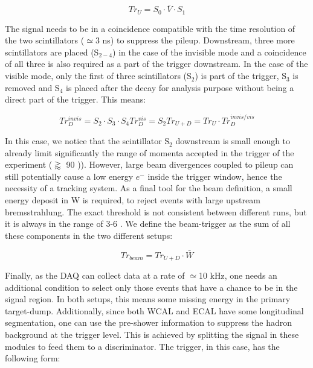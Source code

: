 \begin{equation}
\label{eq:trigger-upstream}
Tr_U = S_0 \cdot \bar{V} \cdot S_1
\end{equation}

The signal needs to be in a coincidence compatible with the time resolution of the two scintillators ($\simeq$3 \si{ns}) to suppress the pileup. Downstream, three more scintillators are placed (S$_{2-4}$) in the case of the invisible mode and a coincidence of all three is also required as a part of the trigger downstream. In the case of the visible mode, only the first of three scintillators (S$_2$) is part of the trigger, S$_3$ is removed and S$_4$ is placed after the decay for analysis purpose without being a direct part of the trigger. This means:

\begin{equation}
\label{eq:trigger-downstream}
Tr^{invis}_D = S_2 \cdot S_3 \cdot S_4
Tr^{vis}_D = S_2
Tr_{U+D} = Tr_U \cdot Tr^{invis/vis}_D
\end{equation}

In this case, we notice that the scintillator S$_2$ downstream is small enough to already limit significantly the range of momenta accepted in the trigger of the experiment ($\gtrapprox$ 90 \si{\gev})). However, large beam divergences coupled to pileup can still potentially cause a low energy $e^-$ inside the trigger window, hence the necessity of a tracking system. As a final tool for the beam definition, a small energy deposit in W is required, to reject events with large upstream bremsstrahlung. The exact threshold is not consistent between different runs, but it is always in the range of 3-6 \gev. We define the beam-trigger as the sum of all these components in the two different setups:

\begin{equation}
\label{eq:trigger-beam}
Tr_{beam} = Tr_{U+D} \cdot \bar{W}
\end{equation}

Finally, as the DAQ can collect data at a rate of $\simeq$10 \si{kHz}, one needs an additional condition to select only those events that have a chance to be in the signal region. In both setups, this means some missing energy in the primary target-dump. Additionally, since both WCAL and ECAL have some longitudinal segmentation, one can use the pre-shower information to suppress the hadron background at the trigger level. This is achieved by splitting the signal in these modules to feed them to a discriminator. The trigger, in this case, has the following form:


